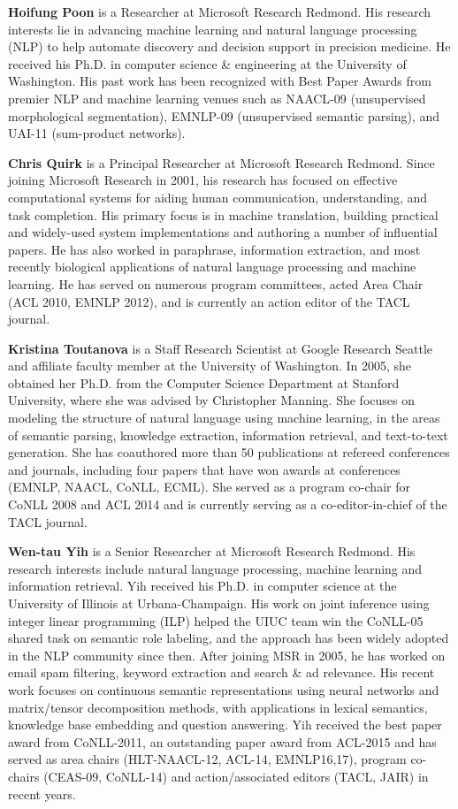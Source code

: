 \begin{bio}
  {\bfseries Hoifung Poon} is a Researcher at Microsoft Research Redmond. His research interests lie in advancing machine learning and natural language processing (NLP) to help automate discovery and decision support in precision medicine. He received his Ph.D. in computer science \& engineering at the University of Washington. His past work has been recognized with Best Paper Awards from premier NLP and machine learning venues such as NAACL-09 (unsupervised morphological segmentation), EMNLP-09 (unsupervised semantic parsing), and UAI-11 (sum-product networks).

  {\bfseries Chris Quirk} is a Principal Researcher at Microsoft Research Redmond. Since joining Microsoft Research in 2001, his research has focused on effective computational systems for aiding human communication, understanding, and task completion. His primary focus is in machine translation, building practical and widely-used system implementations and authoring a number of influential papers. He has also worked in paraphrase, information extraction, and most recently biological applications of natural language processing and machine learning. He has served on numerous program committees, acted Area Chair (ACL 2010, EMNLP 2012), and is currently an action editor of the TACL journal.

  {\bfseries Kristina Toutanova} is a Staff Research Scientist at Google Research Seattle and affiliate faculty member at the University of Washington. In 2005, she obtained her Ph.D. from the Computer Science Department at Stanford University, where she was advised by Christopher Manning. She focuses on modeling the structure of natural language using machine learning, in the areas of semantic parsing, knowledge extraction, information retrieval, and text-to-text generation. She has coauthored more than 50 publications at refereed conferences and journals, including four papers that have won awards at conferences (EMNLP, NAACL, CoNLL, ECML). She served as a program co-chair for CoNLL 2008 and ACL 2014 and is currently serving as a co-editor-in-chief of the TACL journal.

  {\bfseries Wen-tau Yih} is a Senior Researcher at Microsoft Research Redmond. His research interests include natural language processing, machine learning and information retrieval. Yih received his Ph.D. in computer science at the University of Illinois at Urbana-Champaign. His work on joint inference using integer linear programming (ILP) helped the UIUC team win the CoNLL-05 shared task on semantic role labeling, and the approach has been widely adopted in the NLP community since then. After joining MSR in 2005, he has worked on email spam filtering, keyword extraction and search & ad relevance. His recent work focuses on continuous semantic representations using neural networks and matrix/tensor decomposition methods, with applications in lexical semantics, knowledge base embedding and question answering. Yih received the best paper award from CoNLL-2011, an outstanding paper award from ACL-2015 and has served as area chairs (HLT-NAACL-12, ACL-14, EMNLP16,17), program co-chairs (CEAS-09, CoNLL-14) and action/associated editors (TACL, JAIR) in recent years.


\end{bio}

